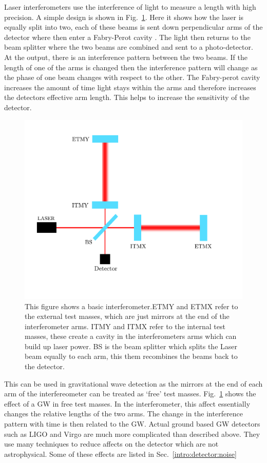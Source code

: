 Laser interferometers use the interference of light to measure a length with high precision.
A simple design is shown in Fig.~\ref{detectors:interferometer}. 
Here it shows how the laser is equally split into two, each of these beams is sent down perpendicular arms of the detector where then enter a Fabry-Perot cavity \citep{}. 
The light then returns to the beam splitter where the two beams are combined and sent to a photo-detector.
At the output, there is an interference pattern between the two beams.
If the length of one of the arms is changed then the interference pattern will change as the phase of one beam changes with respect to the other.
The Fabry-perot cavity increases the amount of time light stays within the arms and therefore increases the detectors effective arm length. This helps to increase the sensitivity of the detector.
\begin{figure}[h]
    \centering
    \includegraphics[width=\textwidth]{C1_Introduction/interferometer.pdf}
    \caption{This figure shows a basic interferometer.ETMY and ETMX refer to the external test masses, which are just mirrors at the end of the interferometer arms. ITMY and ITMX refer to the internal test masses, these create a cavity in the interferometers arms which can build up laser power. BS is the beam splitter which splits the Laser beam equally to each arm, this them recombines the beams back to the detector.}
    \label{detectors:interferometer}
\end{figure}

This can be used in gravitational wave detection as the mirrors at the end of each arm of the interfereometer can be treated as `free' test masses.
Fig.~\ref{detectors:interferometer} shows the effect of a \ac{GW} in free test masses.
In the interferometer, this affect essentially changes the relative lengths of the two arms.
The change in the interference pattern with time is then related to the \ac{GW}.
Actual ground based \ac{GW} detectors such as \ac{LIGO} \citep{} and Virgo \citep{} are much more complicated than described above.
They use many techniques to reduce affects on the detector which are not astrophysical.
Some of these effects are listed in Sec.~\ref{intro:detector:noise}


